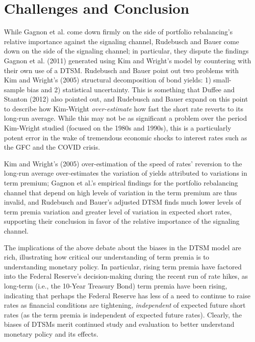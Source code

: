 \documentclass[12pt,final]{article}
\begin{document}
\section{Challenges and Conclusion}
While Gagnon et al. come down firmly on the side of portfolio rebalancing's relative importance against the signaling channel, Rudebusch and Bauer come down on the side of the signaling channel; in particular, they dispute the findings Gagnon et al. (2011) generated using Kim and Wright's model by countering with their own use of a DTSM. \citep{Gagnon2011} \citep{Bauer2014} Rudebusch and Bauer point out two problems with Kim and Wright's (2005) structural decomposition of bond yields: 1) small-sample bias and 2) statistical uncertainty. This is something that Duffee and Stanton (2012) also pointed out, and Rudebusch and Bauer expand on this point to describe how Kim-Wright \textit{over-estimate} how fast the short rate reverts to its long-run average. While this may not be as significant a problem over the period Kim-Wright studied (focused on the 1980s and 1990s), this is a particularly potent error in the wake of tremendous economic shocks to interest rates such as the GFC and the COVID crisis. 

Kim and Wright's (2005) over-estimation of the speed of rates' reversion to the long-run average over-estimates the variation of yields attributed to variations in term premium;  Gagnon et al.'s empirical findings for the portfolio rebalancing channel that depend on high levels of variation in the term premium are thus invalid, and Rudebusch and Bauer's adjusted DTSM finds much lower levels of term premia variation and greater level of variation in expected short rates, supporting their conclusion in favor of the relative importance of the signaling channel.

The implications of the above debate about the biases in the DTSM model are rich, illustrating how critical our understanding of term premia is to understanding monetary policy. In particular, rising term premia have factored into the Federal Reserve's decision-making during the recent run of rate hikes, as long-term (i.e., the 10-Year Treasury Bond) term premia have been rising, indicating that perhaps the Federal Reserve has less of a need to continue to raise rates as financial conditions are tightening, \textit{independent} of expected future short rates (as the term premia is independent of expected future rates). Clearly, the biases of DTSMs merit continued study and evaluation to better understand monetary policy and its effects.
\end{document}
